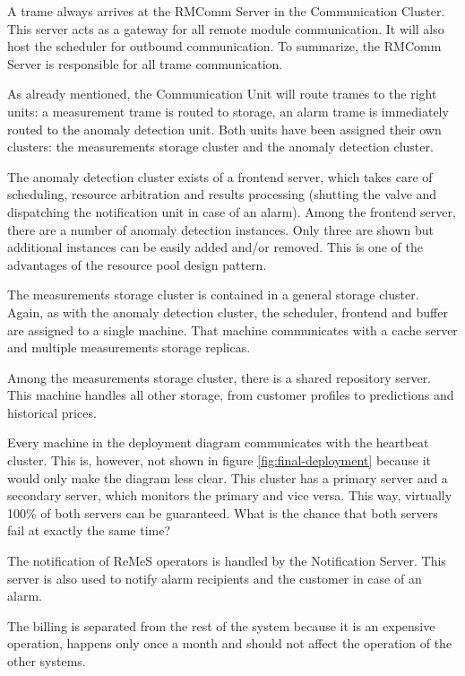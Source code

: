 \npar A trame always arrives at the RMComm Server in the Communication Cluster.
This server acts as a gateway for all remote module communication. It will also
host the scheduler for outbound communication. To summarize, the RMComm Server
is responsible for all trame communication. 

\npar As already mentioned, the Communication Unit will route trames to the
right units: a measurement trame is routed to storage, an alarm trame is
immediately routed to the anomaly detection unit. Both units have been assigned
their own clusters: the measurements storage cluster and the anomaly detection
cluster.

\npar The anomaly detection cluster exists of a frontend server, which takes
care of scheduling, resource arbitration and results processing
(shutting the valve and dispatching the notification unit in case of an alarm).
Among the frontend server, there are a number of anomaly detection instances.
Only three are shown but additional instances can be easily added and/or
removed. This is one of the advantages of the resource pool design pattern.

\npar The measurements storage cluster is contained in a general storage
cluster. Again, as with the anomaly detection cluster, the scheduler, frontend
and buffer are assigned to a single machine. That machine communicates with a
cache server and multiple measurements storage replicas. 

\npar Among the measurements storage cluster, there is a shared repository
server. This machine handles all other storage, from customer profiles to
predictions and historical prices. 

\npar Every machine in the deployment diagram communicates with the heartbeat
cluster. This is, however, not shown in figure \ref{fig:final-deployment}
because it would only make the diagram less clear. This cluster has a primary
server and a secondary server, which monitors the primary and vice versa. This
way, virtually 100\% of both servers can be guaranteed. What is the chance that
both servers fail at exactly the same time?

\npar The notification of ReMeS operators is handled by the Notification Server.
This server is also used to notify alarm recipients and the customer in case of
an alarm. 

\npar The billing is separated from the rest of the system because it is an
expensive operation, happens only once a month and should not affect the
operation of the other systems. 

